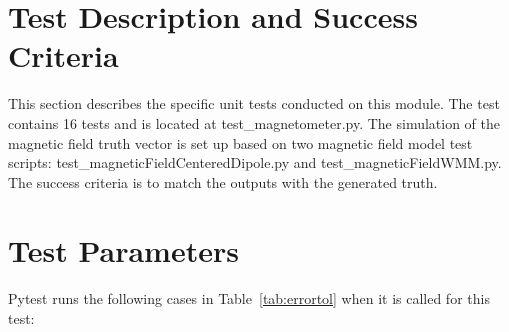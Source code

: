 
\section{Test Description and Success Criteria}

This section describes the specific unit tests conducted on this module. The test contains 16 tests and is located at test\_magnetometer.py. The simulation of the magnetic field truth vector is set up based on two magnetic field model test scripts: test\_magneticFieldCenteredDipole.py and test\_magneticFieldWMM.py. The success criteria is to match the outputs with the generated truth.

\section{Test Parameters}
Pytest runs the following cases in Table~\ref{tab:errortol} when it is called for this test: 
